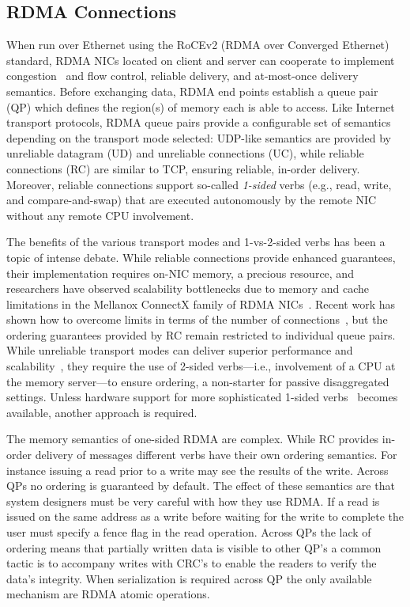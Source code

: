 \documentclass[12pt]{ucsddissertation}
\begin{document}
\subsection{RDMA Connections}

When run over Ethernet using the RoCEv2 (RDMA over Converged Ethernet) standard, RDMA NICs located
on client and server can cooperate to implement congestion~\cite{hpcc,dcqcn} and flow control,
reliable delivery, and at-most-once delivery semantics.  Before exchanging data, RDMA end points
establish a queue pair (QP) which defines the region(s) of memory each is able to access.  Like
Internet transport protocols, RDMA queue pairs provide a configurable set of semantics depending on
the transport mode selected: UDP-like semantics are provided by unreliable datagram (UD) and
unreliable connections (UC), while reliable connections (RC) are similar to TCP, ensuring reliable,
in-order delivery.  Moreover, reliable connections support so-called \emph{1-sided} verbs (e.g.,
read, write, and compare-and-swap) that are executed autonomously by the remote NIC without any
remote CPU involvement.

The benefits of the various transport modes and 1-vs-2-sided verbs has been a topic of intense
debate.  While reliable connections provide enhanced guarantees, their implementation requires
on-NIC memory, a precious resource, and researchers have observed scalability bottlenecks due to
memory and cache limitations in the Mellanox ConnectX family of RDMA
NICs~\cite{farm,fasst,erpc,lite,design-guidelines}.  Recent work has shown how to overcome limits in
terms of the number of connections~\cite{storm,flock}, but the ordering guarantees provided by RC
remain restricted to individual queue pairs.  While unreliable transport modes can deliver superior
performance and scalability~\cite{fasst}, they require the use of 2-sided verbs---i.e., involvement
of a CPU at the memory server---to ensure ordering, a non-starter for passive disaggregated
settings.  Unless hardware support for more sophisticated 1-sided verbs~\cite{filemr,rma,star}
becomes available, another approach is required.

The memory semantics of one-sided RDMA are complex. While RC provides in-order delivery of messages
different verbs have their own ordering semantics. For instance issuing a read prior to a write may
see the results of the write. Across QPs no ordering is guaranteed by default. The effect of these
semantics are that system designers must be very careful with how they use RDMA. If a read is issued
on the same address as a write before waiting for the write to complete the user must specify a
fence flag in the read operation. Across QPs the lack of ordering means that partially written data
is visible to other QP's a common tactic is to accompany writes with CRC's to enable the readers to
verify the data's integrity. When serialization is required across QP the only available mechanism
are RDMA atomic operations.
\end{document}
